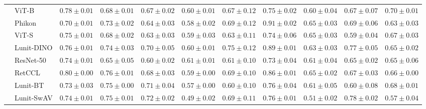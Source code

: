 \begin{tabular}{ll|cccc|c|cccc}
 & ViT-B & $0.78 \pm 0.01$ & $0.68 \pm 0.01$ & $0.67 \pm 0.02$ & $0.60 \pm 0.01$ & $0.67 \pm 0.12$ & $0.75 \pm 0.02$ & $0.60 \pm 0.04$ & $0.67 \pm 0.07$ & $\mathbf{0.70 \pm 0.01}$ \\
 & Phikon & $0.70 \pm 0.01$ & $0.73 \pm 0.02$ & $0.64 \pm 0.03$ & $0.58 \pm 0.02$ & $0.69 \pm 0.12$ & $\mathbf{0.91 \pm 0.02}$ & $\mathbf{0.65 \pm 0.03}$ & $0.69 \pm 0.06$ & $0.63 \pm 0.03$ \\
 & ViT-S & $0.75 \pm 0.01$ & $0.68 \pm 0.02$ & $0.63 \pm 0.03$ & $0.59 \pm 0.03$ & $0.63 \pm 0.11$ & $0.74 \pm 0.06$ & $0.65 \pm 0.03$ & $0.59 \pm 0.04$ & $0.67 \pm 0.03$ \\
 & Lunit-DINO & $0.76 \pm 0.01$ & $0.74 \pm 0.03$ & $0.70 \pm 0.05$ & $0.60 \pm 0.01$ & $\mathbf{0.75 \pm 0.12}$ & $0.89 \pm 0.01$ & $0.63 \pm 0.03$ & $0.77 \pm 0.05$ & $0.65 \pm 0.02$ \\
 & ResNet-50 & $0.74 \pm 0.01$ & $0.65 \pm 0.05$ & $0.60 \pm 0.02$ & $0.61 \pm 0.01$ & $0.61 \pm 0.10$ & $0.73 \pm 0.04$ & $0.61 \pm 0.04$ & $0.65 \pm 0.02$ & $0.65 \pm 0.06$ \\
 & RetCCL & $0.80 \pm 0.00$ & $\mathbf{0.76 \pm 0.01}$ & $0.68 \pm 0.03$ & $0.59 \pm 0.00$ & $0.69 \pm 0.10$ & $0.86 \pm 0.01$ & $0.65 \pm 0.02$ & $0.67 \pm 0.03$ & $0.66 \pm 0.00$ \\
 & Lunit-BT & $0.73 \pm 0.03$ & $0.75 \pm 0.00$ & $0.71 \pm 0.04$ & $0.57 \pm 0.00$ & $0.60 \pm 0.10$ & $0.76 \pm 0.04$ & $0.61 \pm 0.05$ & $0.60 \pm 0.08$ & $0.68 \pm 0.01$ \\
 & Lunit-SwAV & $0.74 \pm 0.01$ & $0.75 \pm 0.01$ & $\mathbf{0.72 \pm 0.02}$ & $0.49 \pm 0.02$ & $0.69 \pm 0.11$ & $0.76 \pm 0.01$ & $0.51 \pm 0.02$ & $\mathbf{0.78 \pm 0.02}$ & $0.57 \pm 0.04$ \\
\cline{1-11}
\bottomrule
\end{tabular}

